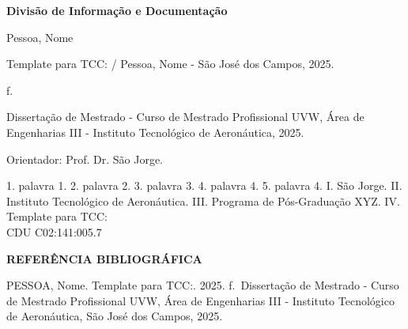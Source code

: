 \documentclass[
  12pt,
  oneside,
  a4paper,
  english,
  brazil]{abntex2}
\begin{document}
\textbf{Divisão de Informação e Documentação}

\vspace{-3mm}

\begin{framed}

\begin{center}
\begin{minipage}[c]{13.5cm}

\footnotesize

\vspace{-5mm}

Pessoa, Nome

\hspace{0.5cm} Template para TCC: / Pessoa, Nome - São José dos Campos, 2025.

\hspace{0.5cm} \pageref{LastPage} f.

\vspace{5mm}

\hspace{0.5cm} Dissertação de Mestrado - Curso de Mestrado Profissional UVW, Área de Engenharias III - Instituto Tecnológico de Aeronáutica, 2025.

\vspace{5mm}

\hspace{0.5cm} Orientador: Prof. Dr. São Jorge.

\hspace{0.5cm}
    1. palavra 1.
    2. palavra 2.
    3. palavra 3.
    4. palavra 4.
    5. palavra 4.
    I. São Jorge.
    II. Instituto Tecnológico de Aeronáutica.
    III. Programa de Pós-Graduação XYZ.
    IV. Template para TCC:\\            

\hspace{9.75cm} CDU C02:141:005.7\\

\vspace{-8mm}

\normalsize

\end{minipage}
\end{center}

\end{framed}

\vfill

\textbf{REFERÊNCIA BIBLIOGRÁFICA}

\uppercase{ Pessoa}, Nome. Template para TCC:. 2025. \pageref{LastPage}
f.~Dissertação de Mestrado - Curso de Mestrado Profissional UVW, Área de
Engenharias III - Instituto Tecnológico de Aeronáutica, São José dos
Campos, 2025.
\end{document}
